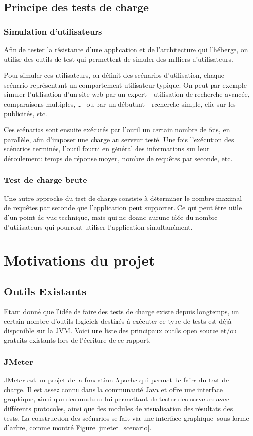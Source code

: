 \subsection{Principe des tests de charge}
\subsubsection{Simulation d'utilisateurs}
Afin de tester la résistance d'une application et de l'architecture qui l'héberge, on utilise des outils de test qui permettent de simuler des milliers d'utilisateurs.

Pour simuler ces utilisateurs, on définit des scénarios d'utilisation, chaque scénario représentant un comportement utilisateur typique. On peut par exemple simuler l'utilisation d'un site web par un expert - utilisation de recherche avancée, comparaisons multiples, \ldots - ou par un débutant - recherche simple, clic sur les publicités, etc.

Ces scénarios sont ensuite exécutés par l'outil un certain nombre de fois, en parallèle, afin d'imposer une charge au serveur testé. Une fois l'exécution des scénarios terminée, l'outil fourni en général des informations sur leur déroulement: temps de réponse moyen, nombre de requêtes par seconde, etc.

\subsubsection{Test de charge brute}
Une autre approche du test de charge consiste à déterminer le nombre maximal de requêtes par seconde que l'application peut supporter. Ce qui peut être utile d'un point de vue technique, mais qui ne donne aucune idée du nombre d'utilisateurs qui pourront utiliser l'application simultanément.

\section{Motivations du projet}
\subsection{Outils Existants}
Etant donné que l'idée de faire des tests de charge existe depuis longtemps, un certain nombre d'outils logiciels destinés à exécuter ce type de tests est déjà disponible sur la JVM. Voici une liste des principaux outils open source et/ou gratuits existants lors de l'écriture de ce rapport.

\subsubsection{JMeter} 
JMeter est un projet de la fondation Apache qui permet de faire du test de charge. Il est assez connu dans la communauté Java et offre une interface graphique, ainsi que des modules lui permettant de tester des serveurs avec différents protocoles, ainsi que des modules de visualisation des résultats des tests. La construction des scénarios se fait via une interface graphique, sous forme d'arbre, comme montré Figure \ref{jmeter_scenario}.

